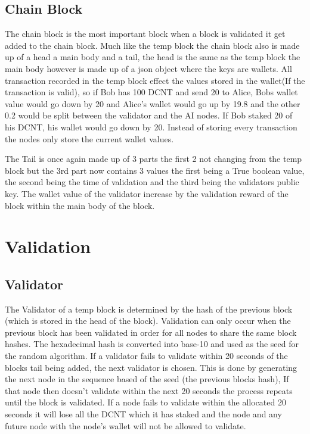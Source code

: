 \documentclass[11pt]{extarticle}
\begin{document}
\subsection{Chain Block}
The chain block is the most important block when a block is validated it get added to the chain block. Much like the temp block the chain block also is made up of a head a main body and a tail, the head is the same as the temp block the main body however is made up of a json object where the keys are wallets. All transaction recorded in the temp block effect the values stored in the wallet(If the transaction is valid), so if Bob has 100 DCNT and send 20 to Alice, Bobs wallet value would go down by 20 and Alice's wallet would go up by 19.8 and the other 0.2 would be split between the validator and the AI nodes. If Bob staked 20 of his DCNT, his wallet would go down by 20. Instead of storing every transaction the nodes only store the current wallet values. 

The Tail is once again made up of 3 parts the first 2 not changing from the temp block but the 3rd part now contains 3 values the first being a True boolean value, the second being the time of validation and the third being the validators public key. The wallet value of the validator increase by the validation reward of the block within the main body of the block.



\section{Validation}
\subsection{Validator}
The Validator of a temp block is determined by the hash of the previous block (which is stored in the head of the block). Validation can only occur when the previous block has been validated in order for all nodes to share the same block hashes. The hexadecimal hash is converted into base-10 and used as the seed for the random algorithm. If a validator fails to validate within 20 seconds of the blocks tail being added, the next validator is chosen. This is done by generating the next node in the sequence based of the seed (the previous blocks hash), If that node then doesn't validate within the next 20 seconds the process repeats until the block is validated. If a node fails to validate within the allocated 20 seconds it will lose all the DCNT which it has staked and the node and any future node with the node's wallet will not be allowed to validate.
\end{document}
